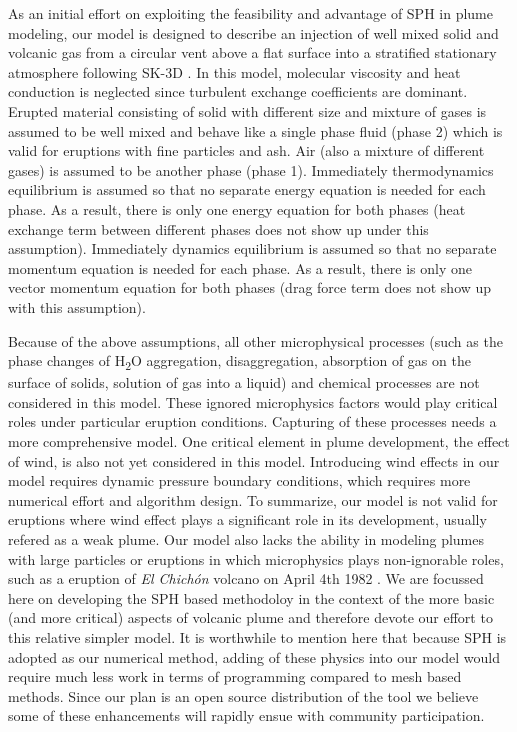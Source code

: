 \documentclass[journal abbreviation, manuscript]{copernicus}
\begin{document}
As an initial effort on exploiting the feasibility and advantage of SPH in plume modeling, our model is designed to describe an injection of well mixed solid and volcanic gas from a circular vent above a flat surface into a stratified stationary atmosphere following SK-3D \citep{suzuki2005numerical}. In this model, molecular viscosity and heat conduction is neglected since turbulent exchange coefficients are dominant. Erupted material consisting of solid with different size and mixture of gases is assumed to be well mixed and behave like a single phase fluid (phase 2) which is valid for eruptions with fine particles and ash. Air (also a mixture of different gases) is assumed to be another phase (phase 1). Immediately thermodynamics equilibrium is assumed so that no separate energy equation is needed for each phase. As a result, there is only one energy equation for both phases (heat exchange term between different phases does not show up under this assumption). Immediately dynamics equilibrium is assumed so that no separate momentum equation is needed for each phase. As a result, there is only one vector momentum equation for both phases (drag force term does not show up with this assumption). 

Because of the above assumptions, all other microphysical processes (such as the phase changes of \texorpdfstring{H\textsubscript{2}O}, aggregation, disaggregation, absorption of gas on the surface of solids, solution of gas into a liquid) and chemical processes are not considered in this model. These ignored microphysics factors would play critical roles under particular eruption conditions. Capturing of these processes needs a more comprehensive model. One critical element in plume development, the effect of wind, is also not yet considered in this model. Introducing wind effects in our model requires dynamic pressure boundary conditions, which requires more numerical effort and algorithm design. To summarize, our model is not valid for eruptions where wind effect plays a significant role in its development, usually refered as a weak plume. Our model also lacks the ability in modeling plumes with large particles or eruptions in which microphysics plays non-ignorable roles, such as a eruption of \textit{El Chich{\'o}n} volcano on April 4th 1982 \citep{sigurdsson19841982, folch2016fplume}. We are focussed here on developing the SPH based methodoloy in the context of the more basic (and more critical) aspects of volcanic plume and therefore devote our effort to this relative simpler model. It is worthwhile to mention here that because SPH is adopted as our numerical method, adding of these physics into our model would require much less work in terms of programming compared to mesh based methods. Since our plan is an open source distribution of the tool we believe some of these enhancements will rapidly ensue with community participation.
\end{document}
